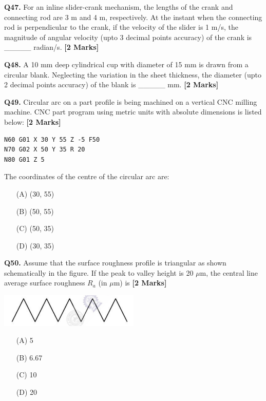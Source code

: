 \documentclass[11pt]{article}
\newcommand{\questionb}[2]{
    \noindent\textbf{Q#2.} #1 \hfill \textbf{[2 Marks]}
}
\begin{document}
\questionb{For an inline slider-crank mechanism, the lengths of the crank and connecting rod are 3 m and 4 m, respectively. At the instant when the connecting rod is perpendicular to the crank, if the velocity of the slider is 1 m/s, the magnitude of angular velocity (upto 3 decimal points accuracy) of the crank is \_\_\_\_\_ radian/s.}{47}
\vspace{0.5cm}

\questionb{A 10 mm deep cylindrical cup with diameter of 15 mm is drawn from a circular blank. Neglecting the variation in the sheet thickness, the diameter (upto 2 decimal points accuracy) of the blank is \_\_\_\_\_ mm.}{48}
\vspace{0.5cm}

\questionb{Circular arc on a part profile is being machined on a vertical CNC milling machine. CNC part program using metric units with absolute dimensions is listed below:}{49}
\begin{verbatim}
N60 G01 X 30 Y 55 Z -5 F50
N70 G02 X 50 Y 35 R 20
N80 G01 Z 5
\end{verbatim}
The coordinates of the centre of the circular arc are:
\begin{enumerate}
    \item[(A)] (30, 55)
    \item[(B)] (50, 55)
    \item[(C)] (50, 35)
    \item[(D)] (30, 35)
\end{enumerate}
\vspace{0.5cm}

\questionb{Assume that the surface roughness profile is triangular as shown schematically in the figure. If the peak to valley height is 20 \(\mu\)m, the central line average surface roughness \(R_a\) (in \(\mu\)m) is}{50}
\begin{center}
\includegraphics[width=0.5\textwidth]{figures/50.png}
\end{center}
\begin{enumerate}
    \item[(A)] 5
    \item[(B)] 6.67
    \item[(C)] 10
    \item[(D)] 20
\end{enumerate}
\vspace{0.5cm}
\end{document}
